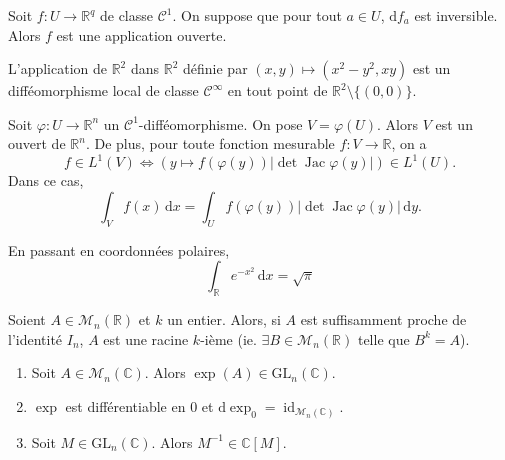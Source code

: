   \begin{corollary}
    Soit $f : U \rightarrow \mathbb{R}^q$ de classe $\mathcal{C}^1$. On suppose que pour tout $a \in U$, $\mathrm{d}f_a$ est inversible. Alors $f$ est une application ouverte.
  \end{corollary}


  \begin{example}
    L'application de $\mathbb{R}^2$ dans $\mathbb{R}^2$ définie par $(x, y) \mapsto (x^2-y^2, xy)$ est un difféomorphisme local de classe $\mathcal{C}^\infty$ en tout point de $\mathbb{R}^2 \setminus \{(0,0)\}$.
  \end{example}


  \begin{application}
    Soit $\varphi : U \to \mathbb{R}^n$ un $\mathcal{C}^1$-difféomorphisme. On pose $V = \varphi(U)$. Alors $V$ est un ouvert de $\mathbb{R}^n$. De plus, pour toute fonction mesurable $f : V \to \mathbb{R}$, on a
    \[
      f \in L^1(V)
      \iff
      \left(y \mapsto
      f(\varphi(y)) \left| \det \operatorname{Jac}\varphi(y) \right|\right)
      \in L^1(U).
    \]
    Dans ce cas,
    \[
      \int_V f(x) \, \mathrm{d}x
      =
      \int_U f(\varphi(y))
      \left| \det \operatorname{Jac}\varphi(y) \right| \, \mathrm{d}y.
    \]
  \end{application}


  \begin{example}
    En passant en coordonnées polaires,
    \[ \int_{\mathbb{R}} e^{-x^2} \, \mathrm{d}x = \sqrt{\pi} \]
  \end{example}


  \begin{application}
    Soient $A \in \mathcal{M}_n(\mathbb{R})$ et $k$ un entier. Alors, si $A$ est suffisamment proche de l'identité $I_n$, $A$ est une racine $k$-ième (ie. $\exists B \in \mathcal{M}_n(\mathbb{R})$ telle que $B^k = A$).
  \end{application}


  \begin{lemma}
    \begin{enumerate}[label={\bfseries(\roman*)}]
      \item Soit $A \in \mathcal{M}_n(\mathbb{C})$. Alors $\exp(A) \in \mathrm{GL}_n(\mathbb{C})$.
      \item $\exp$ est différentiable en $0$ et $\mathrm{d}\exp_0 = \operatorname{id}_{\mathcal{M}_n(\mathbb{C})}$.
      \item Soit $M \in \mathrm{GL}_n(\mathbb{C})$. Alors $M^{-1} \in \mathbb{C}[M]$.
    \end{enumerate}
  \end{lemma}

